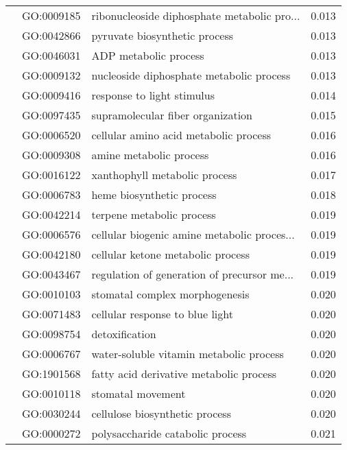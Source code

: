 \begin{longtable}{lllr}
   & GO:0009185 &  ribonucleoside diphosphate metabolic pro... &         0.013 \\
   & GO:0042866 &                pyruvate biosynthetic process &         0.013 \\
   & GO:0046031 &                        ADP metabolic process &         0.013 \\
   & GO:0009132 &     nucleoside diphosphate metabolic process &         0.013 \\
   & GO:0009416 &                   response to light stimulus &         0.014 \\
   & GO:0097435 &            supramolecular fiber organization &         0.015 \\
   & GO:0006520 &        cellular amino acid metabolic process &         0.016 \\
   & GO:0009308 &                      amine metabolic process &         0.016 \\
   & GO:0016122 &                xanthophyll metabolic process &         0.017 \\
   & GO:0006783 &                    heme biosynthetic process &         0.018 \\
   & GO:0042214 &                    terpene metabolic process &         0.019 \\
   & GO:0006576 &  cellular biogenic amine metabolic proces... &         0.019 \\
   & GO:0042180 &            cellular ketone metabolic process &         0.019 \\
   & GO:0043467 &  regulation of generation of precursor me... &         0.019 \\
   & GO:0010103 &               stomatal complex morphogenesis &         0.020 \\
   & GO:0071483 &              cellular response to blue light &         0.020 \\
   & GO:0098754 &                               detoxification &         0.020 \\
   & GO:0006767 &      water-soluble vitamin metabolic process &         0.020 \\
   & GO:1901568 &      fatty acid derivative metabolic process &         0.020 \\
   & GO:0010118 &                            stomatal movement &         0.020 \\
   & GO:0030244 &               cellulose biosynthetic process &         0.020 \\
   & GO:0000272 &             polysaccharide catabolic process &         0.021 \\

\end{longtable}
